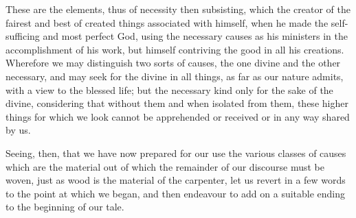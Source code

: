 These are the elements, thus of necessity then subsisting, which the
creator of the fairest and best of created things associated with himself,
when he made the self-sufficing and most perfect God, using the necessary
causes as his ministers in the accomplishment of his work, but himself
contriving the good in all his creations. Wherefore we may distinguish two
sorts of causes, the one divine and the other necessary, and may seek for
the divine in all things, as far as our nature admits, with a view to the
blessed life; but the necessary kind only for the sake of the divine,
considering that without them and when isolated from them, these higher
things for which we look cannot be apprehended or received or in any way
shared by us.

Seeing, then, that we have now prepared for our use the various classes of
causes which are the material out of which the remainder of our discourse
must be woven, just as wood is the material of the carpenter, let us
revert in a few words to the point at which we began, and then endeavour
to add on a suitable ending to the beginning of our tale.


